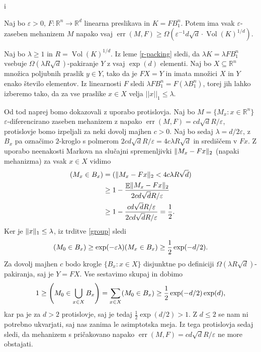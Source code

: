 i\documentclass[mat1]{fmfdelo}
\DeclarePairedDelimiter{\norm}{\lVert}{\rVert}
\newcommand{\R}{\mathbb R}
\let\P\relax \DeclareMathOperator*{\P}{\mathbb P}
\DeclareMathOperator*{\E}{\mathbb E}
\DeclareMathOperator{\Vol}{Vol}
\DeclareMathOperator*{\err}{err}
\newcommand{\query}{F: \R^n \to \R^d}
\begin{document}
\begin{izrek} \label{lowerbound}
	Naj bo $\varepsilon > 0$, $\query$ linearna preslikava in $K=FB_1^n$. Potem ima vsak $\varepsilon$-zaseben mehanizem $M$ napako vsaj $\err(M,F) \geq \Omega(\varepsilon^{-1} d \sqrt{d} \cdot \Vol(K)^{1/d})$.
\end{izrek}

\begin{dokaz}
	Naj bo $\lambda \geq 1$ in $R=\Vol(K)^{1/d}$. Iz leme \ref{r-packing} sledi, da $\lambda K = \lambda FB_1^n$ vsebuje $\Omega(\lambda R \sqrt{d})$-pakiranje $Y$ z vsaj $\exp(d)$ elementi. Naj bo $X \subseteq \R^n$ množica poljubnih praslik $y \in Y$, tako da je $FX=Y$ in imata množici $X$ in $Y$ enako število elementov. Iz linearnosti $F$ sledi $\lambda F B_1^n = F(\lambda B_1^n)$, torej jih lahko izberemo tako, da za vse praslike $x \in X$ velja $||x||_1 \leq \lambda$. 
	
	Od tod naprej bomo dokazovali z uporabo protislovja. Naj bo $M = \{M_x: x \in \R^n \}$ $\varepsilon$-diferencirano zaseben mehanizem z napako $\err(M, F)=cd\sqrt{d}R/\varepsilon$, protislovje bomo izpeljali za neki dovolj majhen $c>0$. Naj bo sedaj $\lambda = d/2\varepsilon$, z $B_x$ pa označimo $2$-kroglo s polmerom $2cd\sqrt{d}R/\varepsilon=4c\lambda R \sqrt{d}$ in središčem v $Fx$. Z uporabo neenakosti Markova na slučajni spremenljivki $\norm{M_x-Fx}_2$ (napaki mehanizma) za vsak $x \in X$ vidimo
	\begin{align*}
	    \P(M_x \in  B_x) &= \P(\norm{M_x-Fx}_2 < 4c\lambda R \sqrt{d}) \\
	    &\geq 1 - \frac{\E\norm{M_x-Fx}_2}{2cd\sqrt{d}R/\varepsilon} \\
	    &\geq 1 - \frac{cd\sqrt{d}R/\varepsilon}{2cd\sqrt{d}R/\varepsilon} = \frac{1}{2}.
	\end{align*}
	Ker je $\norm{x}_1 \leq \lambda$, iz trditve \ref{group} sledi
	\begin{equation*}
	    \P(M_0 \in B_x) \geq \exp(-\varepsilon \lambda) \P(M_x \in B_x) \geq \frac{1}{2} \exp(-d/2).
	\end{equation*}
	Za dovolj majhen $c$ bodo krogle $\{B_x: x \in X\}$ disjunktne po definiciji $\Omega(\lambda R \sqrt{d})$-pakiranja, saj je $Y=FX$. Vse sestavimo skupaj in dobimo
	\begin{equation*}
	    1 \geq \P\left(M_0 \in \bigcup_{x \in X}B_x\right) = \sum_{x\in X} \P(M_0 \in B_x) \geq \frac{1}{2} \exp(-d/2) \exp(d),
	\end{equation*}
	kar pa je za $d  > 2$ protislovje, saj je tedaj $\frac{1}{2} \exp(d/2) > 1$. Z $d \leq 2$ se nam ni potrebno ukvarjati, saj nas zanima le asimptotska meja. Iz tega protislovja sedaj sledi, da mehanizem s pričakovano napako $\err(M, F)=cd\sqrt{d}R/\varepsilon$ ne more obstajati.
\end{dokaz}
\end{document}
